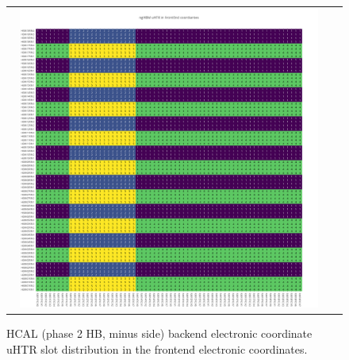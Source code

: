 \clearpage
\begin{figure}[htb]
 \begin{center}
  \begin{tabular}{cc}
   \includegraphics[angle=0,width=0.95\textwidth]{figures/appendix/ngHBM_uHTR_in_FrontEnd.png}
  \end{tabular}
  \caption{HCAL (phase 2 HB, minus side) backend electronic coordinate uHTR slot distribution in the frontend electronic coordinates.}
  \label{fig:lmapngHBMuHTRFEC}
 \end{center}
\end{figure}

